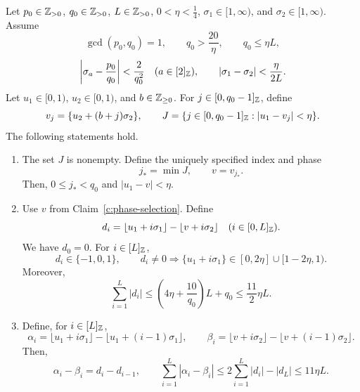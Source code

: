 \begin{lemma}\label{lem:phase-prefix-discrepancy}
Let $p_0\in\mathbb Z_{>0}$, $q_0\in\mathbb Z_{>0}$, $L\in\mathbb Z_{>0}$, $0<\eta<\frac14$, $\sigma_1\in[1,\infty)$, and $\sigma_2\in[1,\infty)$. Assume
\[
 \gcd(p_0,q_0)=1,\qquad
 q_0>\frac{20}{\eta},\qquad q_0\le\eta L,
\]
\[
 \left|\sigma_a-\frac{p_0}{q_0}\right|<\frac{2}{q_0^2}
 \quad(a\in[2]_{\mathbb Z}),\qquad
 |\sigma_1-\sigma_2|<\frac{\eta}{2L}.
\]
Let $u_1\in[0,1)$, $u_2\in[0,1)$, and $b\in\mathbb Z_{\ge0}$. For $j\in[0,q_0-1]_{\mathbb Z}$, define
\[
 v_j=\{u_2+(b+j)\sigma_2\},\qquad
 J=\{j\in[0,q_0-1]_{\mathbb Z}:|u_1-v_j|<\eta\}.
\]
The following statements hold.

\begin{enumerate}
\item\label{c:phase-selection} The set $J$ is nonempty. Define the uniquely specified index and phase
\[
j_* =\min J,\qquad v=v_{j_*}.
\]
Then, $0\le j_*<q_0$ and $|u_1-v|<\eta$.

\item\label{c:phase-prefix-mass} Use $v$ from Claim~\ref{c:phase-selection}. Define
\[
d_i=\lfloor u_1+i\sigma_1\rfloor-\lfloor v+i\sigma_2\rfloor
\quad(i\in[0,L]_{\mathbb Z}).
\]
We have $d_0=0$. For $i\in[L]_{\mathbb Z}$,
\[
d_i\in\{-1,0,1\},\qquad
d_i\ne0\Longrightarrow
\{u_1+i\sigma_1\}\in[0,2\eta]\cup[1-2\eta,1).
\]
Moreover,
\[
\sum_{i=1}^L|d_i|
\le\left(4\eta+\frac{10}{q_0}\right)L+q_0
\le\frac{11}{2}\eta L.
\]

\item\label{c:phase-run-variation} Define, for $i\in[L]_{\mathbb Z}$,
\[
\alpha_i=\lfloor u_1+i\sigma_1\rfloor-\lfloor u_1+(i-1)\sigma_1\rfloor,
\qquad
\beta_i=\lfloor v+i\sigma_2\rfloor-\lfloor v+(i-1)\sigma_2\rfloor.
\]
Then,
\[
\alpha_i-\beta_i=d_i-d_{i-1},\qquad
\sum_{i=1}^L|\alpha_i-\beta_i|
\le2\sum_{i=1}^L|d_i|-|d_L|
\le11\eta L.
\]
\end{enumerate}
\end{lemma}
